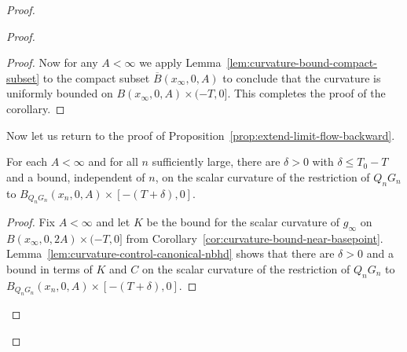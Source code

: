\begin{proof}
\begin{proof}
\begin{proof}
Now for any $A<\infty$ we apply Lemma~\ref{lem:curvature-bound-compact-subset} to the compact
subset $\overline B(x_\infty,0,A)$ to conclude that the curvature is
uniformly bounded on $B(x_\infty,0,A)\times (-T,0]$. This completes
the proof of the corollary.
\end{proof}

Now let us return to the proof of Proposition~\ref{prop:extend-limit-flow-backward}.

\begin{claim}
\label{claim:uniform-curvature-bound-extended-interval}
For each $A<\infty$ and for all $n$ sufficiently large, there are
$\delta>0$ with $\delta\le T_0-T$ and a bound, independent of $n$,
on the scalar curvature of the restriction of $Q_nG_n$ to
$B_{Q_nG_n}(x_n,0,A)\times [-(T+\delta),0]$.
\end{claim}

\begin{proof}
Fix $A<\infty$ and let $K$ be the bound for the scalar curvature of
$g_\infty$ on $B(x_\infty,0,2A)\times (-T,0]$ from
Corollary~\ref{cor:curvature-bound-near-basepoint}.  Lemma~\ref{lem:curvature-control-canonical-nbhd} shows that
there are $\delta>0$ and a bound in terms of $K$ and $C$ on the
scalar curvature of the restriction of $Q_nG_n$ to
$B_{Q_nG_n}(x_n,0,A)\times [-(T+\delta),0]$.
\end{proof}


\end{proof}
\end{proof}

